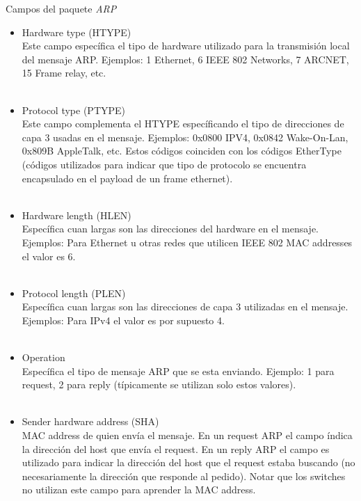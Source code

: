 \vspace{1cm}

Campos del paquete \textit{ARP}
\begin{itemize}
\item Hardware type (HTYPE) \\
Este campo espec\'ifica el tipo de hardware utilizado para la transmisi\'on local del mensaje ARP. 	Ejemplos: 1 Ethernet, 6 IEEE 802 Networks, 7 ARCNET, 15 Frame relay, etc. \\\

\item Protocol type (PTYPE) \\
	Este campo complementa el HTYPE espec\'ificando el tipo de direcciones de capa 3 usadas en el mensaje. Ejemplos: 0x0800 IPV4, 0x0842 Wake-On-Lan, 0x809B AppleTalk, etc. Estos c\'odigos coinciden con los c\'odigos EtherType (c\'odigos utilizados para indicar que tipo de protocolo se encuentra encapsulado en el payload de un frame ethernet). \\\
	
\item Hardware length (HLEN)\\
Espec\'ifica cuan largas son las direcciones del hardware en el mensaje. Ejemplos: Para Ethernet u otras redes que utilicen IEEE 802 MAC addresses el valor es 6. \\\

\item Protocol length (PLEN) \\
Espec\'ifica cuan largas son las direcciones de capa 3 utilizadas en el mensaje. Ejemplos: Para IPv4 el valor es por supuesto 4. \\\

\item Operation  \\
Espec\'ifica el tipo de mensaje ARP que se esta enviando. Ejemplo: 1 para request, 2 para reply (t\'ipicamente se utilizan solo estos valores). \\\
  
\item  Sender hardware address (SHA) \\
   MAC address de quien env\'ia el mensaje. En un request ARP el campo \'indica la direcci\'on del host que env\'ia el request. En un reply ARP el campo es utilizado para indicar la direcci\'on del host que el request estaba buscando (no necesariamente la direcci\'on que responde al pedido). Notar que los switches no utilizan este campo para aprender la MAC address. \\\
   

\end{itemize}

